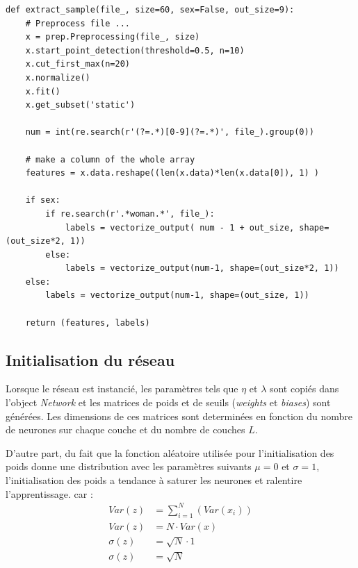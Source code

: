 \documentclass[11pt]{article}
\begin{document}
\begin{lstlisting}
def extract_sample(file_, size=60, sex=False, out_size=9):
    # Preprocess file ...
    x = prep.Preprocessing(file_, size)
    x.start_point_detection(threshold=0.5, n=10)
    x.cut_first_max(n=20)
    x.normalize()
    x.fit()
    x.get_subset('static')

    num = int(re.search(r'(?=.*)[0-9](?=.*)', file_).group(0))

    # make a column of the whole array
    features = x.data.reshape((len(x.data)*len(x.data[0]), 1) )

    if sex:
        if re.search(r'.*woman.*', file_):
            labels = vectorize_output( num - 1 + out_size, shape=(out_size*2, 1))
        else:
            labels = vectorize_output(num-1, shape=(out_size*2, 1))
    else:
        labels = vectorize_output(num-1, shape=(out_size, 1))

    return (features, labels)

\end{lstlisting}

\subsection{Initialisation du r\'eseau}
Lorsque le r\'eseau est instanci\'e, les param\`etres tels que $\eta$ et $\lambda$
sont copi\'es dans l'object \emph{Network} et les matrices de poids et de
seuils (\emph{weights} et \emph{biases}) sont g\'en\'er\'ees. Les dimensions
de ces matrices sont determin\'ees en fonction du nombre de neurones sur chaque
couche et du nombre de couches $L$.


D'autre part, du fait que la fonction al\'eatoire utilis\'ee pour l'initialisation
des poids donne une distribution avec les param\`etres suivants $\mu=0$ et $\sigma=1$,
l'initialisation des poids a tendance \`a saturer les neurones et ralentire l'apprentissage.
car :
\begin{equation}
	\begin{aligned}
		Var(z) &= \sum_{i=1}^N(Var(x_i)) \\
		Var(z) &= N \cdot Var(x) \\
		\sigma(z) &= \sqrt{N} \cdot 1 \\
		\sigma(z) &= \sqrt{N}
	\end{aligned}
\end{equation}
\end{document}
